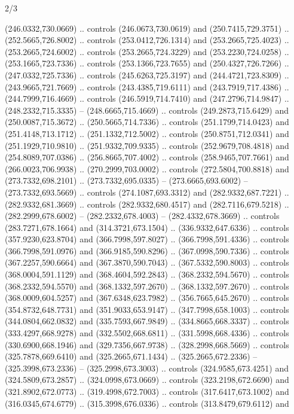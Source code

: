 \begin{flagdescription}{2/3}
\begin{scope}[xshift=0.5\flaglength,yshift=0.5\flagwidth,scale=\flagwidth/525.28]
\begin{scope}[y=0.1mm, x=0.1mm, yscale=-1,shift={(-381.5,-404)}]
\begin{scope}[shift={(5.25001,4.53053)},miter limit=4.00,line width=0.800\lw]
  (246.0332,730.0669) .. controls (246.0673,730.0619) and (250.7415,729.3751) ..
  (252.5665,726.8002) .. controls (253.0412,726.1314) and (253.2665,725.4023) ..
  (253.2665,724.6002) .. controls (253.2665,724.3229) and (253.2230,724.0258) ..
  (253.1665,723.7336) .. controls (253.1366,723.7655) and (250.4327,726.7266) ..
  (247.0332,725.7336) .. controls (245.6263,725.3197) and (244.4721,723.8309) ..
  (243.9665,721.7669) .. controls (243.4385,719.6111) and (243.7919,717.4386) ..
  (244.7999,716.4669) .. controls (246.5919,714.7410) and (247.2796,714.9847) ..
  (248.2332,715.3335) -- (248.6665,715.4669) .. controls (249.2873,715.6429) and
  (250.0087,715.3672) .. (250.5665,714.7336) .. controls (251.1799,714.0423) and
  (251.4148,713.1712) .. (251.1332,712.5002) .. controls (250.8751,712.0341) and
  (251.1929,710.9810) .. (251.9332,709.9335) .. controls (252.9679,708.4818) and
  (254.8089,707.0386) .. (256.8665,707.4002) .. controls (258.9465,707.7661) and
  (266.0023,706.9938) .. (270.2999,703.0002) .. controls (272.5804,700.8818) and
  (273.7332,698.2101) .. (273.7332,695.0335) -- (273.6665,693.6002) --
  (273.7332,693.5669) .. controls (274.1087,693.3312) and (282.9332,687.7221) ..
  (282.9332,681.3669) .. controls (282.9332,680.4517) and (282.7116,679.5218) ..
  (282.2999,678.6002) -- (282.2332,678.4003) -- (282.4332,678.3669) .. controls
  (283.7271,678.1664) and (314.3721,673.1504) .. (336.9332,647.6336) .. controls
  (357.9230,623.8704) and (366.7998,597.8027) .. (366.7998,591.4336) .. controls
  (366.7998,591.0976) and (366.9185,590.8296) .. (367.0998,590.7336) .. controls
  (367.2257,590.6664) and (367.3870,590.7043) .. (367.5332,590.8003) .. controls
  (368.0004,591.1129) and (368.4604,592.2843) .. (368.2332,594.5670) .. controls
  (368.2332,594.5570) and (368.1332,597.2670) .. (368.1332,597.2670) .. controls
  (368.0009,604.5257) and (367.6348,623.7982) .. (356.7665,645.2670) .. controls
  (354.8732,648.7731) and (351.9033,653.9147) .. (347.7998,658.1003) .. controls
  (344.0804,662.0832) and (335.7593,667.9849) .. (334.8665,668.3337) .. controls
  (333.4297,668.9278) and (332.5502,668.6811) .. (331.5998,668.4336) .. controls
  (330.6900,668.1946) and (329.7356,667.9738) .. (328.2998,668.5669) .. controls
  (325.7878,669.6410) and (325.2665,671.1434) .. (325.2665,672.2336) --
  (325.3998,673.2336) -- (325.2998,673.3003) .. controls (324.9585,673.4251) and
  (324.5809,673.2857) .. (324.0998,673.0669) .. controls (323.2198,672.6690) and
  (321.8902,672.0773) .. (319.4998,672.7003) .. controls (317.6417,673.1002) and
  (316.0345,674.6779) .. (315.3998,676.0336) .. controls (313.8479,679.6112) and

\end{scope}
\end{scope}
\end{scope}
\end{flagdescription}
